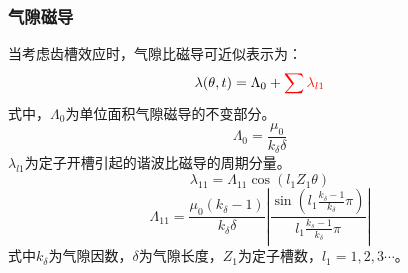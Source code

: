 \documentclass[11pt,a4paper]{article}
\begin{document}
\subsubsection{气隙磁导}
当考虑齿槽效应时，气隙比磁导可近似表示为：
\begin{equation} \label{permeance}
\lambda(\theta, t)=\Lambda_{0}+\textcolor{red}{\sum \lambda_{l1}}
\end{equation}
式中，$ \Lambda_{0} $为单位面积气隙磁导的不变部分。
\begin{equation}\Lambda_{0}=\frac{\mu_{0}}{k_{\delta} \delta}\end{equation}
$ \lambda_{l1} $为定子开槽引起的谐波比磁导的周期分量。
\begin{equation}\lambda_{11}=\Lambda_{11} \cos \left(l_{1} Z_{1} \theta\right)\end{equation}
\begin{equation}
\Lambda_{11}=\frac{\mu_{0}\left(k_{\delta}-1\right)}{k_{\delta} \delta}
\left| \frac{\sin \left(l_{1} \frac{k_{\delta}-1}{k_{\delta}} \pi\right)}{l_{1} \frac{k_{s}-1}{k_{\delta}} \pi } \right| 
\end{equation}
式中$ k_{\delta} $为气隙因数，$ \delta $为气隙长度，$ Z_{1} $为定子槽数，$ l_{1}=1,2,3\cdots $。
\par
\end{document}
